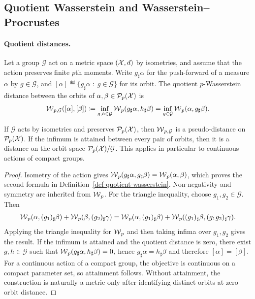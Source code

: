 \subsection{Quotient Wasserstein and Wasserstein--Procrustes}
\label{sec-quotient-wasserstein-procrustes}
\paragraph{Quotient distances.}
\begin{defn}\label{def-quotient-wasserstein}
Let a group $\mathcal G$ act on a metric space $(\mathcal{X},d)$ by isometries, and assume that the action preserves finite $p$th moments. Write $g_\sharp\alpha$ for the push-forward of a measure $\alpha$ by $g\in\mathcal G$, and $[\alpha]\eqdef\{g_\sharp\alpha\;:\;g\in\mathcal G\}$ for its orbit. The quotient $p$-Wasserstein distance between the orbits of $\alpha,\beta\in\mathcal{P}_p(\mathcal{X})$ is
\[
\operatorname{\mathcal{W}}_{p,\mathcal G}([\alpha],[\beta])
\coloneqq
\inf_{g,h\in\mathcal G}\operatorname{\mathcal{W}}_p(g_\sharp\alpha,h_\sharp\beta)
=
\inf_{g\in\mathcal G}\operatorname{\mathcal{W}}_p(\alpha,g_\sharp\beta).
\]
\end{defn}
\begin{prop}\label{prop-quotient-wasserstein-metric}
If $\mathcal G$ acts by isometries and preserves $\mathcal{P}_p(\mathcal{X})$, then $\operatorname{\mathcal{W}}_{p,\mathcal G}$ is a pseudo-distance on $\mathcal{P}_p(\mathcal{X})$. If the infimum is attained between every pair of orbits, then it is a distance on the orbit space $\mathcal{P}_p(\mathcal{X})/\mathcal G$. This applies in particular to continuous actions of compact groups.
\end{prop}
\begin{proof}
Isometry of the action gives $\operatorname{\mathcal{W}}_p(g_\sharp\alpha,g_\sharp\beta)=\operatorname{\mathcal{W}}_p(\alpha,\beta)$, which proves the second formula in Definition~\ref{def-quotient-wasserstein}. Non-negativity and symmetry are inherited from $\operatorname{\mathcal{W}}_p$. For the triangle inequality, choose $g_1,g_2\in\mathcal G$. Then
\[
\operatorname{\mathcal{W}}_p(\alpha,(g_1)_\sharp\beta)
+
\operatorname{\mathcal{W}}_p(\beta,(g_2)_\sharp\gamma)
=
\operatorname{\mathcal{W}}_p(\alpha,(g_1)_\sharp\beta)
+
\operatorname{\mathcal{W}}_p((g_1)_\sharp\beta,(g_1g_2)_\sharp\gamma).
\]
Applying the triangle inequality for $\operatorname{\mathcal{W}}_p$ and then taking infima over $g_1,g_2$ gives the result. If the infimum is attained and the quotient distance is zero, there exist $g,h\in\mathcal G$ such that $\operatorname{\mathcal{W}}_p(g_\sharp\alpha,h_\sharp\beta)=0$, hence $g_\sharp\alpha=h_\sharp\beta$ and therefore $[\alpha]=[\beta]$. For a continuous action of a compact group, the objective is continuous on a compact parameter set, so attainment follows. Without attainment, the construction is naturally a metric only after identifying distinct orbits at zero orbit distance.
\end{proof}

